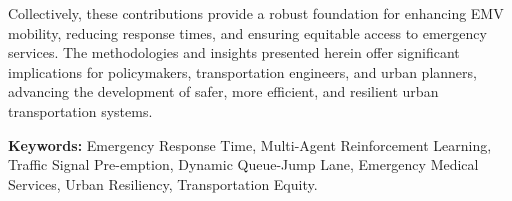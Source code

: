 Collectively, these contributions provide a robust foundation for enhancing EMV mobility, reducing response times, and ensuring equitable access to emergency services. The methodologies and insights presented herein offer significant implications for policymakers, transportation engineers, and urban planners, advancing the development of safer, more efficient, and resilient urban transportation systems.

\textbf{Keywords:} Emergency Response Time, Multi-Agent Reinforcement Learning, Traffic Signal Pre-emption, Dynamic Queue-Jump Lane, Emergency Medical Services, Urban Resiliency, Transportation Equity.